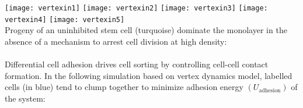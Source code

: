 \documentclass[a0paper,landscape,final]{baposter}
\begin{document}
\begin{poster}
{{        \texttt{[image: vertexin1]}
        \texttt{[image: vertexin2]}
        \texttt{[image: vertexin3]}
        \texttt{[image: vertexin4]}
        \texttt{[image: vertexin5]}
  }
  \\[-0.6cm]
   
  Progeny of an uninhibited stem cell (turquoise) dominate the monolayer in the absence of a mechanism to arrest cell division at high density:\\
   
  \\[-0.6cm]
  
  Differential cell adhesion drives cell sorting by controlling cell-cell contact formation. In the following simulation based on vertex dynamics model, labelled cells (in blue) tend to clump together to minimize adhesion energy $(U_{\text{adhesion}})$ of the system:\\
  
}
  
\end{poster}
\end{document}
